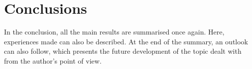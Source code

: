 
\chapter{Conclusions}
\label{chapter:conclusions}

In the conclusion, all the main results are summarised once again. Here, experiences made can also be described. At the end of the summary, an outlook can also follow, which presents the future development of the topic dealt with from the author's point of view.